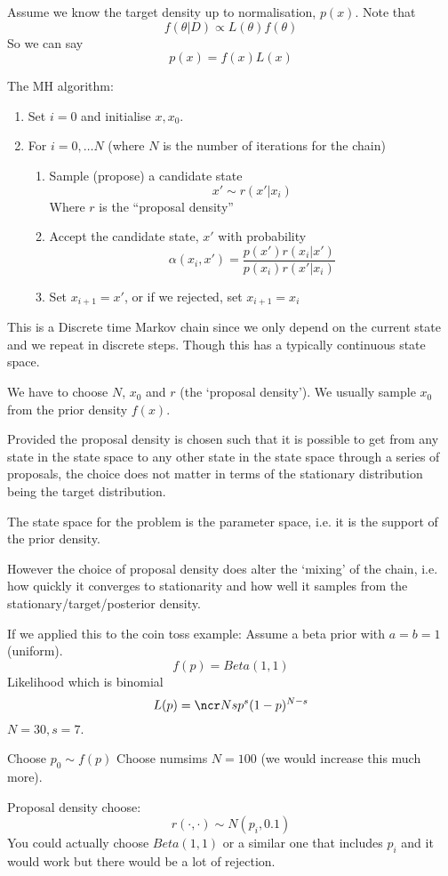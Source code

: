 \documentclass{X:/Documents/Coding/Latex/myassignment}
\begin{document}
Assume we know the target density up to normalisation, $p(x)$.
Note that
\[f(\theta|D) \propto L(\theta) f(\theta)\]
So we can say
\[p(x) = f(x) L(x)\]

The MH algorithm:
\begin{enumerate}
    \item Set $i=0$ and initialise $x,x_0$.
    \item For $i=0,\ldots N$ (where $N$ is the number of iterations for the chain)
    \begin{enumerate}
        \item Sample (propose) a candidate state
        \[x' \sim r(x'|x_i)\]
        Where $r$ is the ``proposal density''
        \item Accept the candidate state, $x'$ with probability 
        \[\alpha(x_i,x') = \frac{p(x') r(x_i|x')}{p(x_i)r(x'|x_i)}\]
        \item Set $x_{i+1} = x'$, or if we rejected, set $x_{i+1} = x_i$
    \end{enumerate}
\end{enumerate}

This is a Discrete time Markov chain since we only depend on the current state and we repeat in discrete steps. 
Though this has a typically continuous state space.


We have to choose $N$, $x_0$ and $r$ (the `proposal density'). We usually sample $x_0$ from the prior density $f(x)$.


Provided the proposal density is chosen such that it is possible to get from any state in the state space to any other state in the state space through a series of proposals, the choice does not matter in terms of the stationary distribution being the target distribution.


The state space for the problem is the parameter space, i.e. it is the support of the prior density.

However the choice of proposal density does alter the `mixing' of the chain, i.e. how quickly it converges to stationarity and how well it samples from the stationary/target/posterior density.

If we applied this to the coin toss example:
Assume a beta prior with $a=b=1$ (uniform).
\[f(p) = Beta(1,1)\]
Likelihood which is binomial
\[L(p) = \ncr Ns p^s (1-p)^{N-s}\]
$N = 30, s =7$.

Choose  $p_0 \sim f(p)$
Choose numsims $N=100$ (we would increase this much more).

Proposal density choose:
\[r(\cdot,\cdot) \sim N(p_i,0.1)\]
You could actually choose $Beta(1,1)$ or a similar one that includes $p_i$ and it would work but there would be a lot of rejection.
\end{document}
